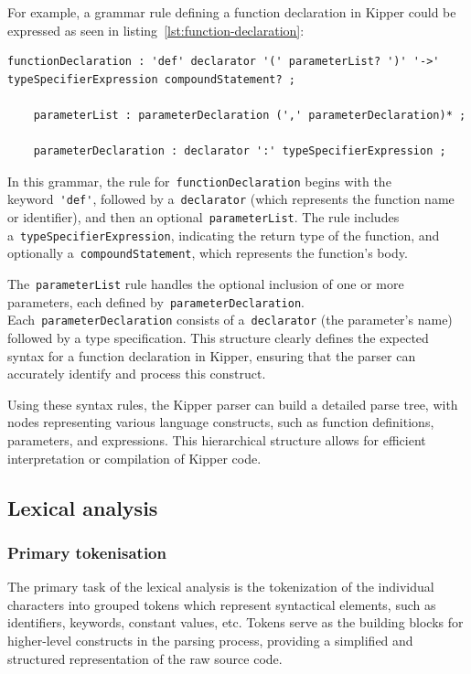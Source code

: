For example, a grammar rule defining a function declaration in Kipper could be expressed as seen in listing~\ref{lst:function-declaration}:

\begin{lstlisting}[language=antlr4, caption={Function Declaration Grammar}, label={lst:function-declaration}]
	functionDeclaration : 'def' declarator '(' parameterList? ')' '->' typeSpecifierExpression compoundStatement? ;
	
	parameterList : parameterDeclaration (',' parameterDeclaration)* ;
	
	parameterDeclaration : declarator ':' typeSpecifierExpression ;
\end{lstlisting}

In this grammar, the rule for~\lstinline|functionDeclaration| begins with the keyword~\lstinline|'def'|, followed by a~\lstinline|declarator| (which represents the function name or identifier), and then an optional~\lstinline|parameterList|. The rule includes a~\lstinline|typeSpecifierExpression|, indicating the return type of the function, and optionally a~\lstinline|compoundStatement|, which represents the function's body.

The~\lstinline|parameterList| rule handles the optional inclusion of one or more parameters, each defined by~\lstinline|parameterDeclaration|. Each~\lstinline|parameterDeclaration| consists of a~\lstinline|declarator| (the parameter's name) followed by a type specification. This structure clearly defines the expected syntax for a function declaration in Kipper, ensuring that the parser can accurately identify and process this construct.

Using these syntax rules, the Kipper parser can build a detailed parse tree, with nodes representing various language constructs, such as function definitions, parameters, and expressions. This hierarchical structure allows for efficient interpretation or compilation of Kipper code.

\subsection{Lexical analysis}

\subsubsection{Primary tokenisation}

The primary task of the lexical analysis is the tokenization of the individual characters into grouped tokens which represent syntactical elements, such as identifiers, keywords, constant values, etc. Tokens serve as the building blocks for higher-level constructs in the parsing process, providing a simplified and structured representation of the raw source code.

